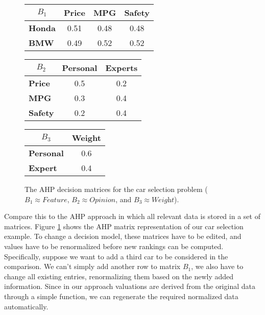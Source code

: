 \documentclass{jfp}
\begin{document}
\begin{figure}[t]
\begin{small}
    \begin{tabular}{@{}l|ccc@{}}
    \multicolumn{1}{c|}{$B_1$} 
    & \bf{Price}  & \bf{MPG} & \bf{Safety} \\
    \hline  
    \bf{Honda}  & 0.51 & 0.48 & 0.48  \\ 
    \bf{BMW}    & 0.49 & 0.52 & 0.52 
    \end{tabular}
\hfill
    \begin{tabular}{@{}l|cc@{}}
    \multicolumn{1}{c|}{$B_2$} 
    & \bf{Personal}  & \bf{Experts}  \\
    \hline  
    \bf{Price}       & 0.5 & 0.2   \\ 
    \bf{MPG}    & 0.3 & 0.4   \\
    \bf{Safety}    & 0.2 & 0.4
    \end{tabular}
\hfill
    \begin{tabular}{@{}l|c@{}}
    \multicolumn{1}{c|}{$B_3$} 
    & \bf{Weight}   \\
    \hline  
    \bf{Personal}  & 0.6  \\ 
    \bf{Expert}  & 0.4
    \end{tabular}
\end{small}
\caption{The AHP decision matrices for the car selection problem
%
($B_1\approx\textit{Feature}$,
$B_2\approx\textit{Opinion}$, and
$B_3\approx\textit{Weight}$).}
\label{fig:matrix}
\end{figure}


Compare this to the AHP approach in which all relevant data is stored in a set of matrices. Figure \ref{fig:matrix} shows the AHP matrix representation of our car selection example.
%
To change a decision model, these matrices have to be edited, and values have to be renormalized before new rankings can be computed.
%
Specifically, suppose we want to add a third car to be considered in the comparison. We can't simply add another row to matrix $B_1$, we also have to change all existing entries, renormalizing them based on the newly added information. Since in our approach valuations are derived from the original data through a simple function, we can regenerate the required normalized data automatically.
\end{document}
